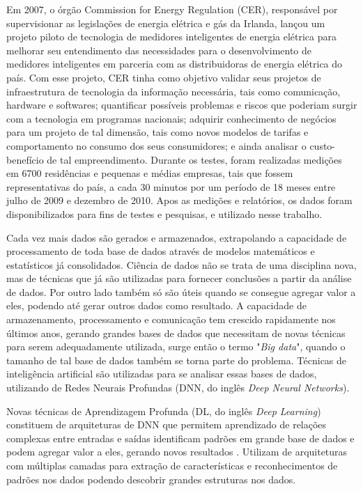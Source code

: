 \documentclass[
	12pt,				%
	oneside,			%
	a4paper,			%
	english,			%
	brazil				%
	]{abntex2}
\begin{document}
	Em 2007, o órgão Commission for Energy Regulation (CER), responsável por supervisionar as legislações de energia elétrica e gás da Irlanda, lançou um projeto piloto de tecnologia de medidores inteligentes de energia elétrica para melhorar seu entendimento das necessidades para o desenvolvimento de medidores inteligentes em parceria com as distribuidoras de energia elétrica do país. \cite{trials2008findings} Com esse projeto, CER tinha como objetivo validar seus projetos de infraestrutura de tecnologia da informação necessária, tais como comunicação, hardware e softwares; quantificar possíveis problemas e riscos que poderiam surgir com a tecnologia em programas nacionais; adquirir conhecimento de negócios para um projeto de tal dimensão, tais como novos modelos de tarifas e comportamento no consumo dos seus consumidores; e ainda analisar o custo-benefício de tal empreendimento. Durante os testes, foram realizadas medições em 6700 residências e pequenas e médias empresas, tais que fossem representativas do país, a cada 30 minutos por um período de 18 meses entre julho de 2009 e dezembro de 2010. Apos as medições e relatórios, os dados foram disponibilizados para fins de testes e pesquisas, e utilizado nesse trabalho.	
	
	Cada vez mais dados são gerados e armazenados, extrapolando a capacidade de processamento de toda base de  dados através de modelos matemáticos e estatísticos já consolidados. Ciência de dados não se trata de uma disciplina nova, mas de técnicas que já são utilizadas para fornecer conclusões a partir da análise de dados. Por outro lado também só são úteis quando se consegue agregar valor a eles, podendo até gerar outros dados como resultado.  A capacidade de armazenamento, processamento e comunicação tem crescido rapidamente nos últimos anos, gerando grandes bases de dados que necessitam de novas técnicas para serem adequadamente utilizada, surge então o termo "\textit{Big data}", quando o tamanho de tal base de dados também se torna parte do problema. \cite{loukides2011data} Técnicas de inteligência artificial são utilizadas para se analisar essas bases de dados, utilizando de Redes Neurais Profundas (DNN, do inglês \textit{Deep Neural Networks}).
	
	Novas técnicas de Aprendizagem Profunda (DL, do inglês \textit{Deep Learning}) constituem de arquiteturas de DNN que permitem aprendizado de relações complexas entre entradas e saídas identificam padrões em grande base de dados e podem agregar valor a eles, gerando novos resultados \cite{amarasinghe2017deep}. Utilizam de arquiteturas com múltiplas camadas para extração de características e reconhecimentos de padrões nos dados podendo descobrir grandes estruturas nos dados.
\end{document}
